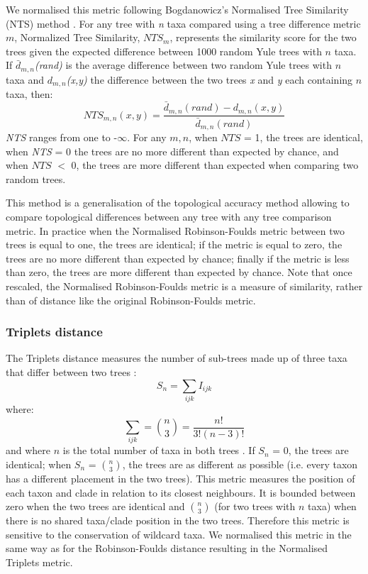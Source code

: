 We normalised this metric following Bogdanowicz's Normalised Tree Similarity (NTS) method \citep{Bogdanowicz2012}.
For any tree with \textit{n} taxa compared using a tree difference metric $m$, Normalized Tree Similarity, $NTS_m$, represents the similarity score for the two trees given the expected difference between 1000 random Yule trees \citep{Bogdanowicz2012} with $n$ taxa. If $\bar{d}_{m,n}$\textit{(rand)} is the average difference between two random Yule trees with $n$ taxa and $d_{m,n}$\textit{(x,y)} the difference between the two trees \textit{x} and \textit{y} each containing $n$ taxa, then:
\begin{equation}
NTS_{m,n}(x,y)=\frac{\bar{d}_{m,n}(rand) - d_{m,n}(x,y)} {\bar{d}_{m,n}(rand)}
\end{equation}
\textit{NTS} ranges from one to -$\infty$.
For any $m,n$, when $NTS$ = 1, the trees are identical, when \textit{NTS} = 0 the trees are no more different than expected by chance, and when $NTS$ $<$ 0, the trees are more different than expected when comparing two random trees. 

This method is a generalisation of the topological accuracy method \citep{Price2010} allowing to compare topological differences between any tree with any tree comparison metric.
In practice when the Normalised Robinson-Foulds metric between two trees is equal to one, the trees are identical; if the metric is equal to zero, the trees are no more different than expected by chance; finally if the metric is less than zero, the trees are more different than expected by chance.
Note that once rescaled, the Normalised Robinson-Foulds metric is a measure of similarity, rather than of distance like the original Robinson-Foulds metric. 

\subsubsection*{Triplets distance}
The Triplets distance \citep{dobson1975triplets} measures the number of sub-trees made up of three taxa that differ between two trees \citep{critchlowthe1996}:
\begin{equation}
S_n = \sum_{ijk} I_{ijk}
\end{equation}
where:
\begin{equation}
\sum_{ijk} = \binom{n}{3} = \frac{n!}{3!(n-3)!}
\end{equation}
and where $n$ is the total number of taxa in both trees \citep{critchlowthe1996}.
If $S_n$ = 0, the trees are identical; when $S_n$ = $\binom{n}{3}$, the trees are as different as possible (i.e. every taxon has a different placement in the two trees).
This metric measures the position of each taxon and clade in relation to its closest neighbours.
It is bounded between zero when the two trees are identical and $\binom{n}{3}$ (for two trees with $n$ taxa) when there is no shared taxa/clade position in the two trees.
Therefore this metric is sensitive to the conservation of wildcard taxa.
We normalised this metric in the same way as for the Robinson-Foulds distance resulting in the Normalised Triplets metric.

